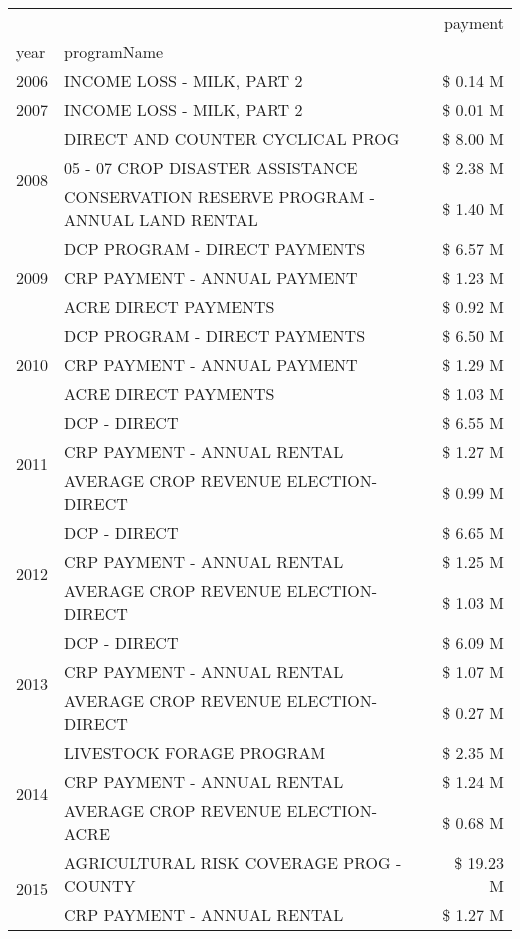 \begin{tabular}{llr}
\toprule
 &  & payment \\
year & programName &  \\
\midrule
2006 & INCOME LOSS - MILK, PART 2 & \$ 0.14 M \\
\cline{1-3}
2007 & INCOME LOSS - MILK, PART 2 & \$ 0.01 M \\
\cline{1-3}
\multirow[t]{3}{*}{2008} & DIRECT AND COUNTER CYCLICAL PROG & \$ 8.00 M \\
 & 05 - 07 CROP DISASTER ASSISTANCE & \$ 2.38 M \\
 & CONSERVATION RESERVE PROGRAM - ANNUAL LAND RENTAL & \$ 1.40 M \\
\cline{1-3}
\multirow[t]{3}{*}{2009} & DCP PROGRAM - DIRECT PAYMENTS & \$ 6.57 M \\
 & CRP PAYMENT - ANNUAL PAYMENT & \$ 1.23 M \\
 & ACRE DIRECT PAYMENTS & \$ 0.92 M \\
\cline{1-3}
\multirow[t]{3}{*}{2010} & DCP PROGRAM - DIRECT PAYMENTS & \$ 6.50 M \\
 & CRP PAYMENT - ANNUAL PAYMENT & \$ 1.29 M \\
 & ACRE DIRECT PAYMENTS & \$ 1.03 M \\
\cline{1-3}
\multirow[t]{3}{*}{2011} & DCP - DIRECT & \$ 6.55 M \\
 & CRP PAYMENT - ANNUAL RENTAL & \$ 1.27 M \\
 & AVERAGE CROP REVENUE ELECTION-DIRECT & \$ 0.99 M \\
\cline{1-3}
\multirow[t]{3}{*}{2012} & DCP - DIRECT & \$ 6.65 M \\
 & CRP PAYMENT - ANNUAL RENTAL & \$ 1.25 M \\
 & AVERAGE CROP REVENUE ELECTION-DIRECT & \$ 1.03 M \\
\cline{1-3}
\multirow[t]{3}{*}{2013} & DCP - DIRECT & \$ 6.09 M \\
 & CRP PAYMENT - ANNUAL RENTAL & \$ 1.07 M \\
 & AVERAGE CROP REVENUE ELECTION-DIRECT & \$ 0.27 M \\
\cline{1-3}
\multirow[t]{3}{*}{2014} & LIVESTOCK FORAGE PROGRAM & \$ 2.35 M \\
 & CRP PAYMENT - ANNUAL RENTAL & \$ 1.24 M \\
 & AVERAGE CROP REVENUE ELECTION-ACRE & \$ 0.68 M \\
\cline{1-3}
\multirow[t]{3}{*}{2015} & AGRICULTURAL RISK COVERAGE PROG - COUNTY & \$ 19.23 M \\
 & CRP PAYMENT - ANNUAL RENTAL & \$ 1.27 M \\

\end{tabular}
